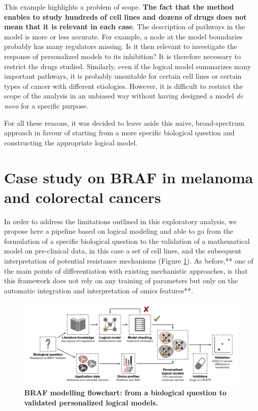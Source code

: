 \documentclass[a4paper,12pt,twoside,onecolumn,openright,final,oldfontcommands]{memoir}
\begin{document}
This example highlights a problem of scope. \textbf{The fact that the
method enables to study hundreds of cell lines and dozens of drugs does
not mean that it is relevant in each case}. The description of pathways
in the model is more or less accurate. For example, a node at the model
boundaries probably has many regulators missing. Is it then relevant to
investigate the response of personalized models to its inhibition? It is
therefore necessary to restrict the drugs studied. Similarly, even if
the logical model summarizes many important pathways, it is probably
unsuitable for certain cell lines or certain types of cancer with
different etiologies. However, it is difficult to restrict the scope of
the analysis in an unbiased way without having designed a model \emph{de
novo} for a specific purpose.

For all these reasons, it was decided to leave aside this naive,
broad-spectrum approach in favour of starting from a more specific
biological question and constructing the appropriate logical model.

\section{Case study on BRAF in melanoma and colorectal
cancers}\label{case-study-on-braf-in-melanoma-and-colorectal-cancers}

In order to address the limitations outlined in this exploratory
analysis, we propose here a pipeline based on logical modeling and able
to go from the formulation of a specific biological question to the
validation of a mathematical model on pre-clinical data, in this case a
set of cell lines, and the subsequent interpretation of potential
resistance mechanisms (Figure \ref{fig:BRAF-GA}). As before,** one of
the main points of differentiation with existing mechanistic approaches,
is that this framework does not rely on any training of parameters but
only on the automatic integration and interpretation of omics
features**.

\begin{figure}

{\centering \includegraphics[width=0.9\linewidth]{fig/BRAF-GA} 

}

\caption[BRAF modelling flowchart: from a biological question to validated personalized logical models]{\textbf{BRAF modelling flowchart: from a
biological question to validated personalized logical models.}}\label{fig:BRAF-GA}
\end{figure}
\end{document}
